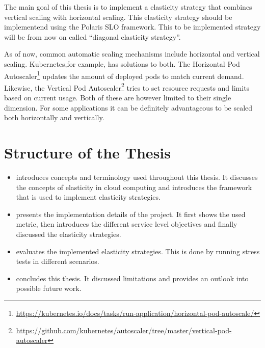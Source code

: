 The main goal of this thesis is to implement a elasticity strategy that combines vertical scaling with horizontal scaling. This elasticity strategy should be implementend using the Polaris SLO framework. This to be implemented strategy will be from now on called ``diagonal elasticity strategy''.

As of now, common automatic scaling mechanisms include horizontal and vertical scaling. Kubernetes,for example, has solutions to both. The Horizontal Pod Autoscaler\footnote{\raggedright\url{https://kubernetes.io/docs/tasks/run-application/horizontal-pod-autoscale/}} updates the amount of deployed pods to match current demand. Likewise, the Vertical Pod Autoscaler\footnote{\raggedright\url{https://github.com/kubernetes/autoscaler/tree/master/vertical-pod-autoscaler}} tries to set resource requests and limits based on current usage. Both of these are however limited to their single dimension. For some applications it can be definitely advantageous to be scaled both horizontally and vertically.

\section{Structure of the Thesis}
\label{sec:structure}

\begin{itemize}
    \item {} introduces concepts and terminology used throughout this thesis. It discusses the concepts of elasticity in cloud computing and introduces the framework that is used to implement elasticity strategies.

    \item {} presents the implementation details of the project. It first shows the used metric, then introduces the different service level objectives and finally discussed the elasticity strategies.

    \item {} evaluates the implemented elasticity strategies. This is done by running stress tests in different scenarios.

    \item {} concludes this thesis. It discussed limitations and provides an outlook into possible future work.
\end{itemize}

